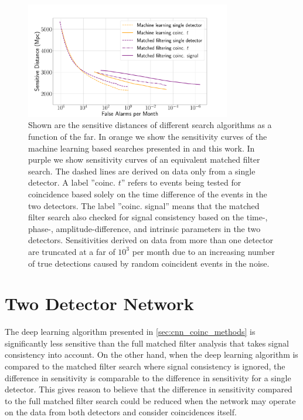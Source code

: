 \begin{figure}
    \centering
    \includegraphics[width=0.8\textwidth, trim=1cm 0 4.2cm 2.5cm, clip]{chapters/cnn_coinc/images/sens.pdf}
    \caption[Sensitive distances as function of false-alarm rate of coincidence searches]{Shown are the sensitive distances of different search algorithms as a function of the \acrshort{far}. In orange we show the sensitivity curves of the machine learning based searches presented in \cite{Schafer:2021fea} and this work. In purple we show sensitivity curves of an equivalent matched filter search. The dashed lines are derived on data only from a single detector. A label ''coinc. $t$'' refers to events being tested for coincidence based solely on the time difference of the events in the two detectors. The label ''coinc. signal'' means that the matched filter search also checked for signal consistency based on the time-, phase-, amplitude-difference, and intrinsic parameters in the two detectors. Sensitivities derived on data from more than one detector are truncated at a \acrshort{far} of $10^3$ per month due to an increasing number of true detections caused by random coincident events in the noise.}
    \label{fig:cnn_coinc_sens}
\end{figure}


\section{Two Detector Network}\label{sec:two-det-net}
The deep learning algorithm presented in \autoref{sec:cnn_coinc_methods} is significantly less sensitive than the full matched filter analysis that takes signal consistency into account. On the other hand, when the deep learning algorithm is compared to the matched filter search where signal consistency is ignored, the difference in sensitivity is comparable to the difference in sensitivity for a single detector. This gives reason to believe that the difference in sensitivity compared to the full matched filter search could be reduced when the network may operate on the data from both detectors and consider coincidences itself.

